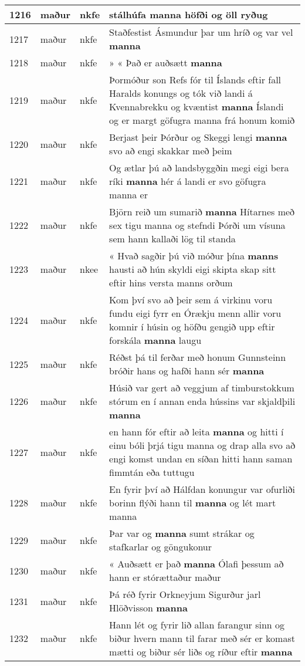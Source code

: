 \documentclass{article}
\begin{document}
\begin{longtable}{p{1cm}|p{1cm}|p{1cm}|p{13cm}}
\hline
1216&maður&nkfe&stálhúfa \textbf{manna} höfði og öll ryðug\\
\hline
1217&maður&nkfe&Staðfestist Ásmundur þar um hríð og var vel \textbf{manna} \\
\hline
1218&maður&nkfe&» « Það er auðsætt \textbf{manna} \\
\hline
1219&maður&nkfe&Þormóður son Refs fór til Íslands eftir fall Haralds konungs og tók við landi á Kvennabrekku og kvæntist \textbf{manna} Íslandi og er margt göfugra manna frá honum komið\\
\hline
1220&maður&nkfe&Berjast þeir Þórður og Skeggi lengi \textbf{manna} svo að engi skakkar með þeim\\
\hline
1221&maður&nkfe&Og ætlar þú að landsbyggðin megi eigi bera ríki \textbf{manna} hér á landi er svo göfugra manna er\\
\hline
1222&maður&nkfe&Björn reið um sumarið \textbf{manna} Hítarnes með sex tigu manna og stefndi Þórði um vísuna sem hann kallaði lög til standa\\
\hline
1223&maður&nkee&« Hvað sagðir þú við móður þína \textbf{manns} hausti að hún skyldi eigi skipta skap sitt eftir hins versta manns orðum\\
\hline
1224&maður&nkfe&Kom því svo að þeir sem á virkinu voru fundu eigi fyrr en Órækju menn allir voru komnir í húsin og höfðu gengið upp eftir forskála \textbf{manna} laugu\\
\hline
1225&maður&nkfe&Réðst þá til ferðar með honum Gunnsteinn bróðir hans og hafði hann sér \textbf{manna} \\
\hline
1226&maður&nkfe&Húsið var gert að veggjum af timburstokkum stórum en í annan enda hússins var skjaldþili \textbf{manna} \\
\hline
1227&maður&nkfe&en hann fór eftir að leita \textbf{manna} og hitti í einu bóli þrjá tigu manna og drap alla svo að engi komst undan en síðan hitti hann saman fimmtán eða tuttugu\\
\hline
1228&maður&nkfe&En fyrir því að Hálfdan konungur var ofurliði borinn flýði hann til \textbf{manna} og lét mart manna\\
\hline
1229&maður&nkfe&Þar var og \textbf{manna} sumt strákar og stafkarlar og göngukonur\\
\hline
1230&maður&nkfe&« Auðsætt er það \textbf{manna} Ólafi þessum að hann er stórættaður maður\\
\hline
1231&maður&nkfe&Þá réð fyrir Orkneyjum Sigurður jarl Hlöðvisson \textbf{manna} \\
\hline
1232&maður&nkfe&Hann lét og fyrir lið allan farangur sinn og biður hvern mann til farar með sér er komast mætti og biður sér liðs og ríður eftir \textbf{manna} \\

\end{longtable}
\end{document}
